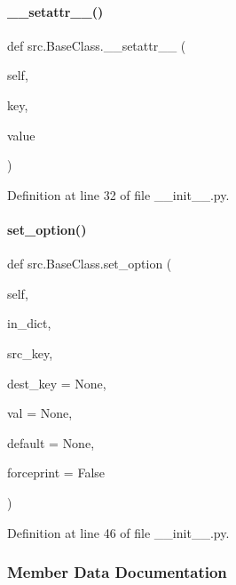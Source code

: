 \paragraph{\texorpdfstring{\+\_\+\+\_\+setattr\+\_\+\+\_\+()}{\_\_setattr\_\_()}}
{\footnotesize\ttfamily def src.\+Base\+Class.\+\_\+\+\_\+setattr\+\_\+\+\_\+ (\begin{DoxyParamCaption}\item[{}]{self,  }\item[{}]{key,  }\item[{}]{value }\end{DoxyParamCaption})}



Definition at line 32 of file \+\_\+\+\_\+init\+\_\+\+\_\+.\+py.

\mbox{\label{classsrc_1_1BaseClass_a4c2a542e94d4001156511f73f7fcb41d}} 
\paragraph{\texorpdfstring{set\+\_\+option()}{set\_option()}}
{\footnotesize\ttfamily def src.\+Base\+Class.\+set\+\_\+option (\begin{DoxyParamCaption}\item[{}]{self,  }\item[{}]{in\+\_\+dict,  }\item[{}]{src\+\_\+key,  }\item[{}]{dest\+\_\+key = {\ttfamily None},  }\item[{}]{val = {\ttfamily None},  }\item[{}]{default = {\ttfamily None},  }\item[{}]{forceprint = {\ttfamily False} }\end{DoxyParamCaption})}



Definition at line 46 of file \+\_\+\+\_\+init\+\_\+\+\_\+.\+py.



\subsubsection{Member Data Documentation}
\mbox{\label{classsrc_1_1BaseClass_a1329cdd50381c56cead0b277647b3329}} 
